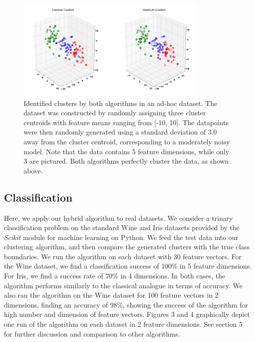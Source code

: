 \documentclass[twocolumn, english]{revtex4-2}
\begin{document}
\begin{figure}
\includegraphics[height=5cm, width=9.3cm]{Figure_3_std}
\caption{Identified clusters by both algorithms in an ad-hoc dataset. The dataset was constructed by randomly assigning three cluster centroids with feature means ranging from [-10, 10]. The datapoints were then randomly generated using a standard deviation of 3.0 away from the cluster centroid, corresponding to a moderately noisy model. Note that the data contains 5 feature dimensions, while only 3 are pictured. Both algorithms perfectly cluster the data, as shown above.}
\end{figure}

\subsection{Classification}
Here, we apply our hybrid algorithm to real datasets. We consider a trinary classification problem on the standard Wine and Iris datasets provided by the \textit{Scikit} module for machine learning on Python. We feed the test data into our clustering algorithm, and then compare the generated clusters with the true class boundaries. We run the algorithm on each dataset with 30 feature vectors. For the Wine dataset, we find a classification success of 100\% in 5 feature dimensions. For Iris, we find a success rate of 70\% in 4 dimensions. In both cases, the algorithm performs similarly to the classical analogue in terms of accuracy. We also ran the algorithm on the Wine dataset for 100 feature vectors in 2 dimensions, finding an accuracy of 98\%, showing the success of the algorithm for high number and dimension of feature vectors. Figures 3 and 4 graphically depict one run of the algorithm on each dataset in 2 feature dimensions. See section 5 for further discussion and comparison to other algorithms.
\end{document}
